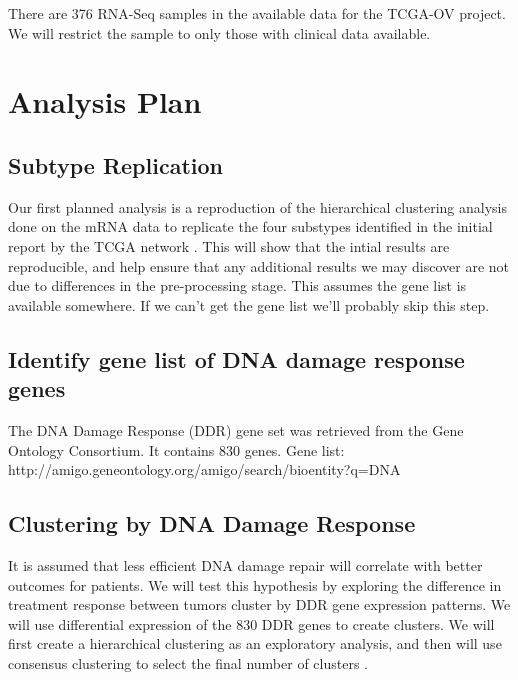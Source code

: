 \documentclass{article}
\begin{document}
There are 376 RNA-Seq samples in the available data for the TCGA-OV project. We will restrict the sample to only those with clinical data available. 



\section{Analysis Plan}

\subsection{Subtype Replication}
   Our first planned analysis is a reproduction of the hierarchical clustering analysis\cite{eisen_cluster_1998} done on the mRNA data to replicate the four substypes identified in the initial report by the TCGA network \cite{cancer2011integrated}. This will show that the intial results are reproducible, and help ensure that any additional results we may discover are not due to differences in the pre-processing stage. This assumes the gene list is available somewhere. If we can't get the gene list we'll probably skip this step. 
   
\subsection{Identify gene list of DNA damage response genes}

The DNA Damage Response (DDR) gene set was retrieved from the Gene Ontology Consortium.  It contains 830 genes.
Gene list: http://amigo.geneontology.org/amigo/search/bioentity?q=DNA%

\subsection{Clustering by DNA Damage Response}
  It is assumed that less efficient DNA damage repair will correlate with better outcomes for patients. We will test this hypothesis by exploring the difference in treatment response between tumors cluster by DDR gene expression patterns. We will use differential expression of the 830 DDR genes to create clusters. We will first create a hierarchical clustering as an exploratory analysis, and then will use consensus clustering to select the final number of clusters \cite{monti_consensus_2003}. 
\end{document}
